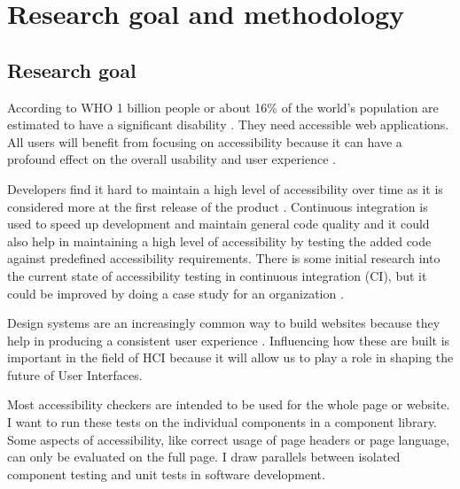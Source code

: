 \documentclass{master_thesis}
\begin{document}
\section{Research goal and methodology}
\subsection{Research goal}


According to WHO 1 billion people or about 16\% of the world's population are estimated to have a significant disability \citep{WHO2022}. They need accessible web applications. All users will benefit from focusing on accessibility because it can have a profound effect on the overall usability and user experience \citep{Miesenberger2020}.

Developers find it hard to maintain a high level of accessibility over time as it is considered more at the first release of the product \citep{Paterno2020}. Continuous integration is used to speed up development and maintain general code quality \citep{Zhao2017} and it could also help in maintaining a high level of accessibility by testing the added code against predefined accessibility requirements. There is some initial research into the current state of accessibility testing in continuous integration (CI), but it could be improved by doing a case study for an organization \citep{Sane2021}.

Design systems are an increasingly common way to build websites because they help in producing a consistent user experience \citep{Yew2020}. Influencing how these are built is important in the field of HCI because it will allow us to play a role in shaping the future of User Interfaces.


Most accessibility checkers are intended to be used for the whole page or website. I want to run these tests on the individual components in a component library. Some aspects of accessibility, like correct usage of page headers or page language, can only be evaluated on the full page. I draw parallels between isolated component testing and unit tests in software development.
\end{document}
